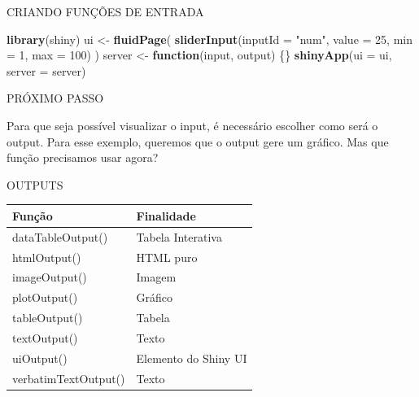 \documentclass[
  ignorenonframetext,
]{beamer}
\newenvironment{Shaded}{\begin{snugshade}}{\end{snugshade}}
\newcommand{\ControlFlowTok}[1]{\textcolor[rgb]{0.13,0.29,0.53}{\textbf{#1}}}
\newcommand{\DataTypeTok}[1]{\textcolor[rgb]{0.13,0.29,0.53}{#1}}
\newcommand{\DecValTok}[1]{\textcolor[rgb]{0.00,0.00,0.81}{#1}}
\newcommand{\KeywordTok}[1]{\textcolor[rgb]{0.13,0.29,0.53}{\textbf{#1}}}
\newcommand{\NormalTok}[1]{#1}
\newcommand{\StringTok}[1]{\textcolor[rgb]{0.31,0.60,0.02}{#1}}
\begin{document}
\begin{frame}[fragile]{CRIANDO FUNÇÕES DE ENTRADA}
\protect\hypertarget{criando-funcoes-de-entrada}{}


\begin{Shaded}
\begin{Highlighting}[]
\KeywordTok{library}\NormalTok{(shiny)}
\NormalTok{ui <-}\StringTok{ }\KeywordTok{fluidPage}\NormalTok{(}
  \KeywordTok{sliderInput}\NormalTok{(}\DataTypeTok{inputId =} \StringTok{"num"}\NormalTok{,}
              \DataTypeTok{value =} \DecValTok{25}\NormalTok{, }
              \DataTypeTok{min =} \DecValTok{1}\NormalTok{, }\DataTypeTok{max =} \DecValTok{100}\NormalTok{) )}
\NormalTok{server <-}\StringTok{ }\ControlFlowTok{function}\NormalTok{(input, output) \{\}}
\KeywordTok{shinyApp}\NormalTok{(}\DataTypeTok{ui =}\NormalTok{ ui, }\DataTypeTok{server =}\NormalTok{ server)}
\end{Highlighting}
\end{Shaded}

\end{frame}

\begin{frame}{PRÓXIMO PASSO}
\protect\hypertarget{proximo-passo}{}

\begin{center}
Para que seja possível \alert{visualizar} o input, é necessário escolher como será o \alert{output.}
Para esse exemplo, queremos que o output gere um \alert{gráfico.}
Mas que \alert{função} precisamos usar agora?
\end{center}

\end{frame}

\begin{frame}{OUTPUTS}
\protect\hypertarget{outputs}{}

\begin{table}
\begin{tabular}{l | l}
Função & Finalidade \\
\hline \hline
dataTableOutput() &  Tabela Interativa \\
htmlOutput() & HTML puro \\ 
imageOutput() & Imagem \\
plotOutput() & Gráfico \\
tableOutput() & Tabela \\
textOutput() & Texto \\
uiOutput() & Elemento do Shiny UI \\
verbatimTextOutput() & Texto \\
\end{tabular}
\end{table}

\end{frame}
\end{document}
